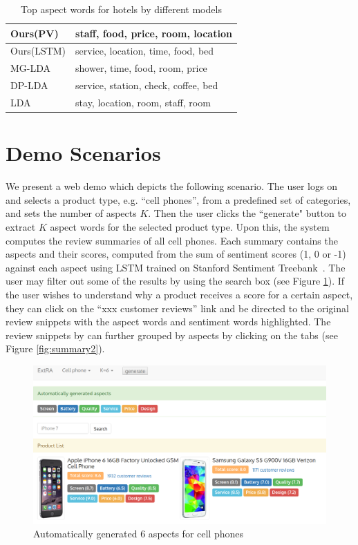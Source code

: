 \documentclass[10pt,final,conference,letterpaper]{IEEEtran}
\newcommand{\figref}[1]{Figure \ref{#1}}
\begin{document}
\begin{table}[th]
\centering
\small
\caption{Top aspect words for hotels by different models}
\label{table:hotel_aspect_words}
\begin{tabular}{|l|l|} \hline
Ours(PV) & staff, food, price, room, location \\ \hline
Ours(LSTM) & service, location, time, food, bed\\ \hline
MG-LDA & shower, time, food, room, price\\ \hline
DP-LDA & service, station, check, coffee, bed \\ \hline
LDA & stay, location, room, staff, room \\ \hline
\end{tabular}
\end{table}
 
\section{Demo Scenarios}
We present a web demo which depicts the following scenario.
The user logs on and selects
a product type, e.g. ``cell phones'', from a predefined set of categories,  
and sets the number of aspects $K$. 
Then the user clicks the ``generate" button to extract $K$ aspect words for the selected product type.
Upon this, the system computes the review summaries of all cell phones. 
Each summary contains the aspects and their scores, computed from the sum of
sentiment scores (1, 0 or -1) against each aspect using LSTM trained on
Stanford Sentiment Treebank~\cite{socher2013recursive}. 
The user may filter out some of the 
results by using the search box (see \figref{fig:summary1}). 
If the user wishes to understand why a product receives a score for a 
certain aspect, they can click on the ``xxx customer reviews'' link
and be directed to the original review snippets with the aspect words and 
sentiment words highlighted. The review snippets by can further grouped by
aspects by clicking on the tabs (see \figref{fig:summary2}). 

\begin{figure}[th]
\includegraphics[width=\columnwidth]{figures/demo1.png}
\caption{Automatically generated 6 aspects for cell phones}
\label{fig:summary1}
\end{figure}
\end{document}
